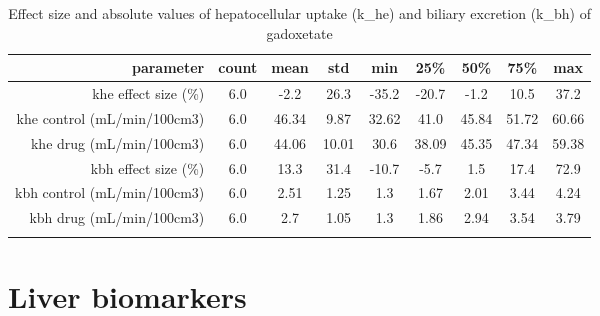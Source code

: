 \documentclass{epflreport}%
\begin{document}
%
\begin{longtable}{rcccccccc}%
\hline%
parameter&count&mean&std&min&25\%&50\%&75\%&max\\%
\hline%
khe effect size (\%)&6.0&{-}2.2&26.3&{-}35.2&{-}20.7&{-}1.2&10.5&37.2\\%
khe control (mL/min/100cm3)&6.0&46.34&9.87&32.62&41.0&45.84&51.72&60.66\\%
khe drug (mL/min/100cm3)&6.0&44.06&10.01&30.6&38.09&45.35&47.34&59.38\\%
kbh effect size (\%)&6.0&13.3&31.4&{-}10.7&{-}5.7&1.5&17.4&72.9\\%
kbh control (mL/min/100cm3)&6.0&2.51&1.25&1.3&1.67&2.01&3.44&4.24\\%
kbh drug (mL/min/100cm3)&6.0&2.7&1.05&1.3&1.86&2.94&3.54&3.79\\%
\hline%
\caption{Effect size and absolute values of hepatocellular uptake (k\_he) and biliary excretion (k\_bh) of gadoxetate} \\%
\end{longtable}%
\clearpage%
\section{Liver biomarkers}%
\label{sec:Liverbiomarkers}%
\end{document}
